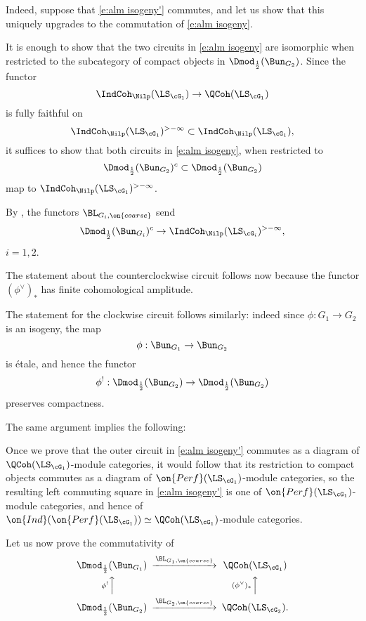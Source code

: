 \documentclass[9pt]{amsart}
\theoremstyle{remark}
\theoremstyle{definition}
\theoremstyle{remark}
\numberwithin{equation}{section}
\begin{document}
\medskip

Indeed, suppose that \eqref{e:alm isogeny'} commutes, and let us show that this uniquely upgrades to the commutation 
of \eqref{e:alm isogeny}. 

\sssec{} \label{sss:phi coconn}

It is enough to show that the two circuits in \eqref{e:alm isogeny} are isomorphic when restricted to the subcategory 
of compact objects in $\Dmod_{\frac{1}{2}}(\Bun_{G_2})$. Since the functor
$$\IndCoh_\Nilp(\LS_{\cG_1}) \to \QCoh(\LS_{\cG_1})$$
is fully faithful on 
$$\IndCoh_\Nilp(\LS_{\cG_1})^{>-\infty}\subset \IndCoh_\Nilp(\LS_{\cG_1}),$$
it suffices to show that both circuits in \eqref{e:alm isogeny}, when restricted to
$$\Dmod_{\frac{1}{2}}(\Bun_{G_2})^c\subset \Dmod_{\frac{1}{2}}(\Bun_{G_2})$$
map to $\IndCoh_\Nilp(\LS_{\cG_1})^{>-\infty}$.

\medskip

By \cite[Theorem 1.6.2]{GLC1}, the functors $\BL_{G_i,\on{coarse}}$ send
$$\Dmod_{\frac{1}{2}}(\Bun_{G_i})^c\to \IndCoh_\Nilp(\LS_{\cG_i})^{>-\infty},$$
$i=1,2$.

\medskip

The statement about the counterclockwise circuit follows now because the functor 
$(\phi^\vee)_*$ has finite cohomological amplitude.

\medskip

The statement for the clockwise circuit follows similarly: indeed since $\phi:G_1\to G_2$ is an isogeny, the map
$$\phi:\Bun_{G_1}\to \Bun_{G_2}$$
is \'etale, and hence the functor 
$$\phi^!:\Dmod_{\frac{1}{2}}(\Bun_{G_2})\to \Dmod_{\frac{1}{2}}(\Bun_{G_2})$$
preserves compactness. 

\sssec{}

The same argument implies the following:

\medskip

Once we prove that the outer circuit in 
\eqref{e:alm isogeny'} commutes as a diagram of
$\QCoh(\LS_{\cG_1})$-module categories, it would follow that its
restriction to compact objects commutes as a diagram
of $\on{Perf}(\LS_{\cG_1})$-module categories, so the
resulting left commuting square in \eqref{e:alm isogeny'}
is one of $\on{Perf}(\LS_{\cG_1})$-module categories,
and hence of 
$\on{Ind}(\on{Perf}(\LS_{\cG_1}))\simeq\QCoh(\LS_{\cG_1})$-module categories.

\sssec{}

Let us now prove the commutativity of 
\begin{equation} \label{e:alm isogeny prime}
\CD
\Dmod_{\frac{1}{2}}(\Bun_{G_1}) @>{\BL_{G_1,\on{coarse}}}>> \QCoh(\LS_{\cG_1}) \\
@A{\phi^!}AA  @A{(\phi^\vee)_*}AA  \\
\Dmod_{\frac{1}{2}}(\Bun_{G_2}) @>{\BL_{G_2,\on{coarse}}}>> \QCoh(\LS_{\cG_2}).
\endCD
\end{equation} 
\end{document}
